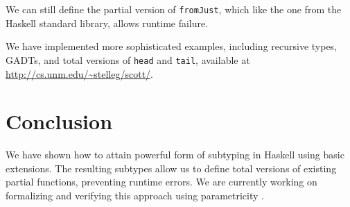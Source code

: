 \documentclass[]{article}
\newenvironment{Shaded}{}{}
\newcommand{\DataTypeTok}[1]{\textcolor[rgb]{0.56,0.13,0.00}{{#1}}}
\newcommand{\StringTok}[1]{\textcolor[rgb]{0.25,0.44,0.63}{{#1}}}
\newcommand{\OtherTok}[1]{\textcolor[rgb]{0.00,0.44,0.13}{{#1}}}
\newcommand{\FunctionTok}[1]{\textcolor[rgb]{0.02,0.16,0.49}{{#1}}}
\newcommand{\NormalTok}[1]{{#1}}
\begin{document}
We can still define the partial version of \texttt{fromJust}, which like
the one from the Haskell standard library, allows runtime failure.

\begin{Shaded}
\end{Shaded}

We have implemented more sophisticated examples, including recursive
types, GADTs, and total versions of \texttt{head} and \texttt{tail},
available at \url{http://cs.unm.edu/~stelleg/scott/}.

\section{Conclusion}\label{conclusion}

We have shown how to attain powerful form of subtyping in Haskell using
basic extensions. The resulting subtypes allow us to define total
versions of existing partial functions, preventing runtime errors. We
are currently working on formalizing and verifying this approach using
parametricity \cite{wadler1989theorems}.


\end{document}
